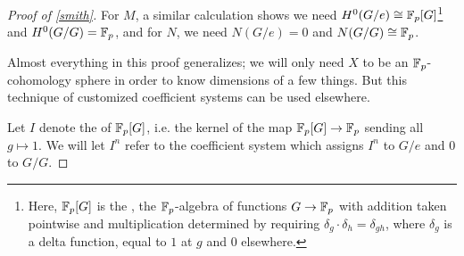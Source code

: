 \begin{proof}[Proof of \cref{smith}]
For $M$, a similar calculation shows we need $H^0(G/e)\cong\mathbb F_p[G]$\footnote{Here, $\mathbb F_p[G]$ is the , the $\mathbb F_p$-algebra of functions $G\to\mathbb F_p$ with addition taken pointwise and multiplication determined by
requiring $\delta_g\cdot\delta_h = \delta_{gh}$, where $\delta_g$ is a delta function, equal to $1$ at $g$ and $0$
elsewhere.} and $H^0(G/G) = \mathbb F_p$, and for $N$, we need $N(G/e) = 0$ and $N(G/G)\cong\mathbb F_p$.
\begin{rem}
Almost everything in this proof generalizes; we will only need $X$ to be an $\mathbb F_p$-cohomology sphere in order to
know dimensions of a few things. But this technique of customized coefficient systems can be used elsewhere.
\end{rem}
Let $I$ denote the  of $\mathbb F_p[G]$, i.e. the kernel of the map $\mathbb F_p[G]\to\mathbb F_p$ sending all
$g\mapsto 1$. We will let $I^n$ refer to the coefficient system which assigns $I^n$ to $G/e$ and $0$ to $G/G$.


\end{proof}
